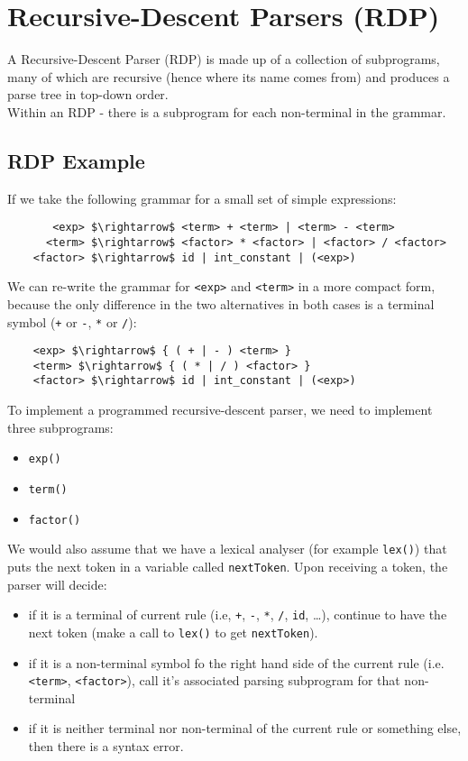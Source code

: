 \section{Recursive-Descent Parsers (RDP)}
A Recursive-Descent Parser (RDP) is made up of a collection of subprograms, many of which are recursive (hence where its name comes from) and produces a parse tree in top-down order.\\

Within an RDP - there is a subprogram for each non-terminal in the grammar. 

\subsection{RDP Example}
If we take the following grammar for a small set of simple expressions:
\begin{lstlisting}
       <exp> $\rightarrow$ <term> + <term> | <term> - <term>
      <term> $\rightarrow$ <factor> * <factor> | <factor> / <factor>
    <factor> $\rightarrow$ id | int_constant | (<exp>)
\end{lstlisting}

We can re-write the grammar for \verb|<exp>| and \verb|<term>| in a more compact form, because the only difference in the two alternatives in both cases is a terminal symbol (\verb|+| or \verb|-|, \verb|*| or \verb|/|):
\begin{lstlisting}
    <exp> $\rightarrow$ { ( + | - ) <term> }
    <term> $\rightarrow$ { ( * | / ) <factor> }
    <factor> $\rightarrow$ id | int_constant | (<exp>)
\end{lstlisting}

To implement a programmed recursive-descent parser, we need to implement three subprograms:
\begin{itemize}
    \item \verb|exp()|
    \item \verb|term()|
    \item \verb|factor()|
\end{itemize}
We would also assume that we have a lexical analyser (for example \verb|lex()|) that puts the next token in a variable called \verb|nextToken|. Upon receiving a token, the parser will decide:
\begin{itemize}
    \item if it is a terminal of current rule (i.e, \verb|+|, \verb|-|, \verb|*|, \verb|/|, \verb|id|, \ldots), continue to have the next token (make a call to \verb|lex()| to get \verb|nextToken|). 
    \item if it is a non-terminal symbol fo the right hand side of the current rule (i.e. \verb|<term>|, \verb|<factor>|), call it's associated parsing subprogram for that non-terminal
    \item if it is neither terminal nor non-terminal of the current rule or something else, then there is a syntax error.
\end{itemize}

